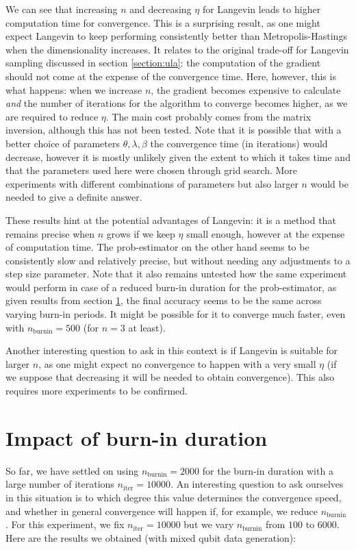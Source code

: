 \documentclass[12pt]{memoir}
\newcommand{\nitern}[1]{$n_{\text{iter}}=#1$}
\newcommand{\nburninn}[1]{$n_{\text{burnin}}=#1$}
\newcommand{\nburnin}[0]{$n_{\text{burnin}} $ }
\begin{document}
We can see that increasing $n$ and decreasing $\eta$ for Langevin leads to higher computation time for convergence. This is a surprising result, as one might expect Langevin to keep performing consistently better than Metropolis-Hastings when the dimensionality increases. It relates to the original trade-off for Langevin sampling discussed in section \ref{section:ula}: the computation of the gradient should not come at the expense of the convergence time. Here, however, this is what happens: when we increase $n$, the gradient becomes expensive to calculate \textit{and} the number of iterations for the algorithm to converge becomes higher, as we are required to reduce $\eta$. The main cost probably comes from the matrix inversion, although this has not been tested. Note that it is possible that with a better choice of parameters $\theta,\lambda,\beta$ the convergence time (in iterations) would decrease, however it is mostly unlikely given the extent to which it takes time and that the parameters used here were chosen through grid search. More experiments with different combinations of parameters but also larger $n$ would be needed to give a definite answer.\medbreak


These results hint at the potential advantages of Langevin: it is a method that remains precise when $n$ grows if we keep $\eta$ small enough, however at the expense of computation time. The prob-estimator on the other hand seems to be consistently slow and relatively precise, but without needing any adjustments to a step size parameter. Note that it also remains untested how the same experiment would perform in case of a reduced burn-in duration for the prob-estimator, as given results from section \ref{section:comp-burnin}, the final accuracy seems to be the same across varying burn-in periods. It might be possible for it to converge much faster, even with \nburninn{500} (for $n=3$ at least).\medbreak


Another interesting question to ask in this context is if Langevin is suitable for larger $n$, as one might expect no convergence to happen with a very small $\eta$ (if we suppose that decreasing it will be needed to obtain convergence). This also requires more experiments to be confirmed.


\section{Impact of burn-in duration}\label{section:comp-burnin}

So far, we have settled on using \nburninn{2000} for the burn-in duration with a large number of iterations \nitern{10000}. An interesting question to ask ourselves in this situation is to which degree this value determines the convergence speed, and whether in general convergence will happen if, for example, we reduce \nburnin. For this experiment, we fix \nitern{10000} but we vary \nburnin from $100$ to $6000$. Here are the results we obtained (with mixed qubit data generation):
\end{document}
